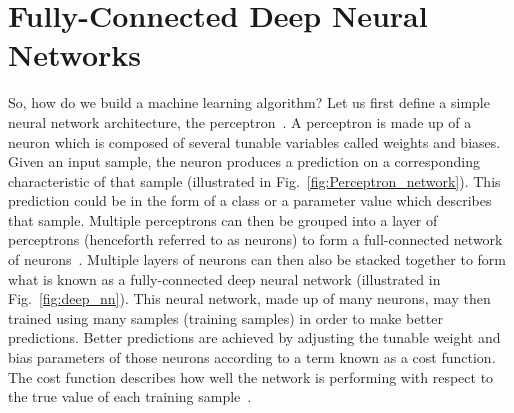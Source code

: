\section{Fully-Connected Deep Neural Networks}

%
%
So, how do we build a machine learning algorithm? Let us  
first define a simple neural network architecture, the perceptron~\cite{minsky69perceptrons}. 
A perceptron is made up of a neuron which is composed of 
several tunable variables called weights and biases. Given an input sample, 
the neuron produces a prediction on a corresponding characteristic of that 
sample (illustrated in Fig.~\ref{fig:Perceptron_network}). 
This prediction could be in the form of a class or a 
parameter value which describes that sample. Multiple perceptrons can 
then be grouped into a layer of perceptrons (henceforth referred to as neurons) 
to form a full-connected network of neurons~\cite{Goodfellow-et-al-2016}. 
Multiple layers of neurons 
can then also be stacked together to form what is known as a 
fully-connected deep neural network (illustrated in Fig.~\ref{fig:deep_nn}). 
This neural network, made up of 
many neurons, may then
trained using many samples (training samples) in order to make 
better predictions. Better predictions are achieved by adjusting the 
tunable weight and 
bias parameters of those neurons according to a term known as a cost function. 
The cost function describes how well the network
is performing with respect to the true value of each training sample~\cite{1702.05659}.



